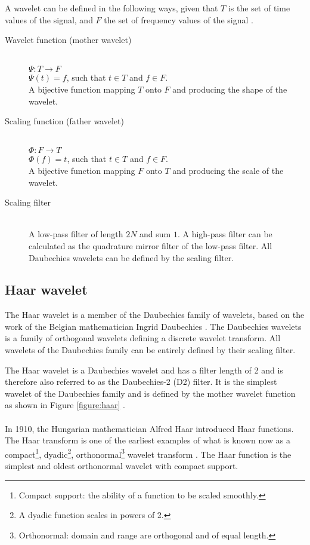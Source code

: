 A wavelet can be defined in the following ways, given that $T$ is the set of
time values of the signal, and $F$ the set of frequency values of the signal 
\cite{graps}.
\begin{description}
	\item[Wavelet function (mother wavelet)] \hfill \\ $\Psi: T \rightarrow
	F$\\ $\Psi(t) = f$, such that $t \in T$ and $f \in F$.\\
	A bijective function mapping $T$ onto $F$ and producing the shape of the
	wavelet.

	\item[Scaling function (father wavelet)] \hfill \\ $\Phi: F \rightarrow
	T$\\ $\Phi(f) = t$, such that $t \in T$ and $f \in F$.\\
	A bijective function mapping $F$ onto $T$ and producing the scale of the
	wavelet.

	\item[Scaling filter] \hfill \\ A low-pass filter of length $2N$ and sum $1$.
	A high-pass filter can be calculated as the quadrature mirror filter of the
	low-pass filter. All Daubechies wavelets can be defined by the scaling filter.
\end{description}

\subsection{Haar wavelet}
The Haar wavelet is a member of the Daubechies family of wavelets, based on the
work of the Belgian mathematician Ingrid Daubechies \cite{graps}. The
Daubechies wavelets is a family of orthogonal wavelets defining a discrete
wavelet transform. All wavelets of the Daubechies family can be entirely
defined by their scaling filter.

The Haar wavelet is a Daubechies wavelet and has a filter length of 2 and
is therefore also referred to as the Daubechies-2 (D2) filter. It is the
simplest wavelet of the Daubechies family and is defined by the mother wavelet
function as shown in Figure \ref{figure:haar} \cite{stankovic}.



\paragraph{}
In 1910, the Hungarian mathematician Alfred Haar introduced Haar functions. The
Haar transform is one of the earliest examples of what is known now as a
compact\footnote{Compact support: the ability of a function to be scaled
smoothly.}, dyadic\footnote{A dyadic function scales in powers of 2.},
orthonormal\footnote{Orthonormal: domain and range are orthogonal and of
equal length.} wavelet transform \cite{stankovic}. The Haar function is the
simplest and oldest orthonormal wavelet with compact support.

